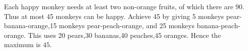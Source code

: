 Each happy monkey needs at least two non-orange fruits, of which there are 90. Thus at most 45 monkeys can be happy. Achieve 45 by giving 5 monkeys pear-banana-orange,15 monkeys pear-peach-orange, and 25 monkeys banana-peach-orange. This uses 20 pears,30 bananas,40 peaches,45 oranges. Hence the maximum is $\boxed{45}$.
